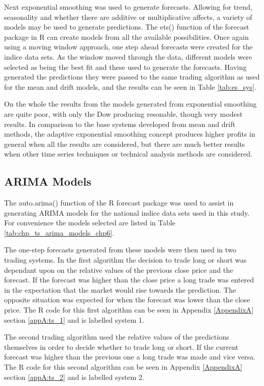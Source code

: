 Next exponential smoothing was used to  generate forecasts. Allowing for trend, seasonality and whether there are additive or multiplicative affects, a variety of models may be used to generate predictions. The ets() function of the forecast package in R can create models from all the available possibilities. Once again using a moving window approach, one step ahead forecasts were created for the indice data sets. As the window moved through the data, different models were selected as being the best fit and these used to generate the forecasts. Having generated the predictions they were passed to the same trading algorithm as used for the mean and drift models, and the results can be seen in Table \ref{tab:es_sys}. 

On the whole the results from the models generated from exponential smoothing are quite poor, with only the Dow producing resonable, though very modest results. In comparison to the base systems developed from mean and drift methods, the adaptive exponential smoothing concept produces higher profits in general when all the results are considered, but there are much better results when other time series techniques or technical analysis methods are considered.

\subsection{ARIMA Models}
The auto.arima() function of the R forecast package was used to assist in generating ARIMA models for the national indice data sets used in this study. For convenience the models selected are listed in Table \ref{tab:chp_ts_arima_models_chp6}.



The one-step forecasts generated from these models were then used in two trading systems. In the first algorithm the decision to trade long or short was dependant upon on the relative values of the previous close price and the forecast. If the forecast was higher than the close price a long trade was entered in the expectation that the market would rise towards the prediction. The opposite situation was expected for when the forecast was lower than the close price. The R code for this first algorithm can be seen in Appendix \ref{AppendixA} section \ref{appA:ts_1} and is labelled system 1.

The second trading algorithm used the relative values of the predictions themselves in order to decide whether to trade long or short. If the current forecast was higher than the previous one a long trade was made and vice versa.  The R code for this second algorithm can be seen in Appendix \ref{AppendixA} section \ref{appA:ts_2} and is labelled system 2.


